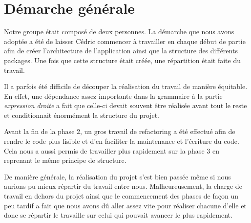 \section{Démarche générale}

Notre groupe était composé de deux personnes. La démarche que nous avons adoptée a été de laisser Cédric commencer à travailler en chaque début de partie afin de créer l'architecture de l'application ainsi que la structure des différents packages. Une fois que cette structure était créée, une répartition était faite du travail.
 
 Il a parfois été difficile de découper la réalisation du travail de manière équitable. En effet, une dépendance assez importante dans la grammaire à la partie \emph{expression droite} a fait que celle-ci devait souvent être réalisée avant tout le reste et conditionnait énormément la structure du projet.
 
 Avant la fin de la phase 2, un gros travail de refactoring a été effectué afin de rendre le code plus lisible et d'en faciliter la maintenance et l'écriture du code. Cela nous a aussi permis de travailler plus rapidement sur la phase 3 en reprenant le même principe de structure.
 
 De manière générale, la réalisation du projet s'est bien passée même si nous aurions pu mieux répartir du travail entre nous. Malheureusement, la charge de travail en dehors du projet ainsi que le commencement des phases de façon un peu tardif a fait que nous avons dû aller assez vite pour réaliser chacune d'elle et donc se répartir le travaille sur celui qui pouvait avancer le plus rapidement.
 